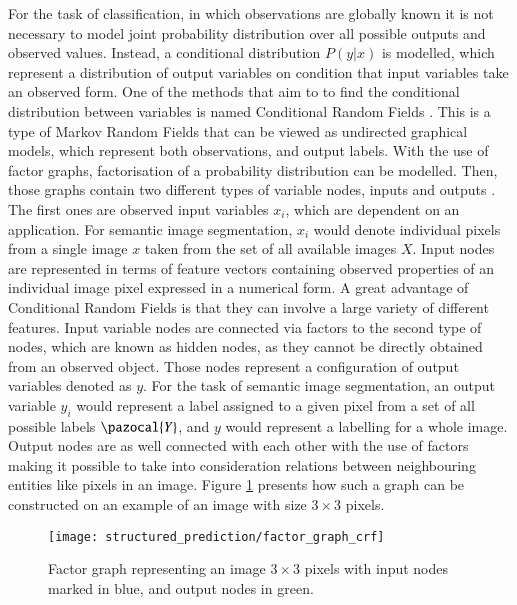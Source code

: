 For the task of classification, in which observations are globally known it is not necessary to model joint probability distribution over all possible outputs and observed values. Instead, a conditional distribution $P(y|x)$ is modelled, which represent a distribution of output variables on condition that input variables take an observed form. One of the methods that aim to to find the conditional distribution between variables is named Conditional Random Fields \cite{crf_lafferty}. This is a type of Markov Random Fields that can be viewed as undirected graphical models, which represent both observations, and output labels. With the use of factor graphs, factorisation of a probability distribution can be modelled. Then, those graphs contain two different types of variable nodes, inputs and outputs \cite{crf_sutton}. The first ones are observed input variables $x_i$, which are dependent on an application. For semantic image segmentation, $x_i$ would denote individual pixels from a single image $x$ taken from the set of all available images $X$. Input nodes are represented in terms of feature vectors containing observed properties of an individual image pixel expressed in a numerical form. A great advantage of Conditional Random Fields is that they can involve a large variety of different features. Input variable nodes are connected via factors to the second type of nodes, which are known as hidden nodes, as they cannot be directly obtained from an observed object. Those nodes represent a configuration of output variables denoted as $y$. For the task of semantic image segmentation, an output variable $y_i$ would represent a label assigned to a given pixel from a set of all possible labels $\pazocal{Y}$, and $y$ would represent a labelling for a whole image. Output nodes are as well connected with each other with the use of factors making it possible to take into consideration relations between neighbouring entities like pixels in an image. Figure \ref{fig:factor_graph_crf} presents how such a graph can be constructed on an example of an image with size $3\times3$ pixels.
\begin{figure}[ht]
    \centering
    \texttt{[image: structured\_prediction/factor\_graph\_crf]}
    \caption[Factor graph representing an image $3\times3$ pixels.]{Factor graph representing an image $3\times3$ pixels with input nodes marked in blue, and output nodes in green.}
     \label{fig:factor_graph_crf}
\end{figure}

